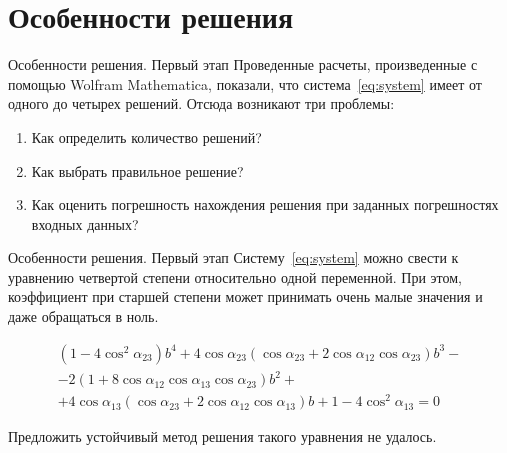 \documentclass[russian,hyperref={unicode}]{beamer}
\begin{document}
  \section{Особенности решения}
  \begin{frame}{Особенности решения. Первый этап}
    Проведенные расчеты, произведенные с помощью Wolfram Mathematica, показали, что система~\eqref{eq:system} имеет от одного до четырех решений. Отсюда возникают три проблемы:
    \begin{enumerate}
      \item Как определить количество решений? \label{q:1}
      \item Как выбрать правильное решение? \label{q:2}
      \item Как оценить погрешность нахождения решения при заданных погрешностях входных данных? \label{q:3}
    \end{enumerate}

  \end{frame}

  \begin{frame}{Особенности решения. Первый этап}
    Систему~\eqref{eq:system} можно свести к уравнению четвертой степени относительно одной переменной. При этом, коэффициент при старшей степени может принимать очень малые значения и даже обращаться в ноль.

    \begin{equation*}
      \begin{array}{l}
      (1-4 \cos^2 \alpha_{23}) b^4 + 4 \cos \alpha_{23} (\cos \alpha_{23} + 2 \cos \alpha_{12} \cos \alpha_{23} ) b^3 - \\
      - 2 (1 + 8 \cos \alpha_{12} \cos \alpha_{13} \cos \alpha_{23}) b^2 +
      \\+ 4 \cos \alpha_{13} (\cos \alpha_{23} + 2 \cos \alpha_{12} \cos \alpha_{13}) b + 1-4 \cos^2 \alpha_{13} =0
      \end{array}
    \end{equation*}

    Предложить устойчивый метод решения такого уравнения не удалось.
  \end{frame}
\end{document}
